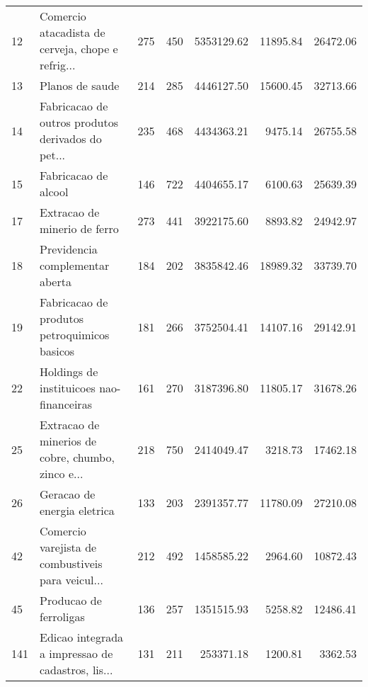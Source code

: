 \begin{tabular}{llrrrrr}
12  &  Comercio atacadista de cerveja, chope e refrig... &                   275 &                  450 &  5353129.62 &   11895.84 &                 26472.06 \\
13  &                                    Planos de saude &                   214 &                  285 &  4446127.50 &   15600.45 &                 32713.66 \\
14  &  Fabricacao de outros produtos derivados do pet... &                   235 &                  468 &  4434363.21 &    9475.14 &                 26755.58 \\
15  &                               Fabricacao de alcool &                   146 &                  722 &  4404655.17 &    6100.63 &                 25639.39 \\
17  &                       Extracao de minerio de ferro &                   273 &                  441 &  3922175.60 &    8893.82 &                 24942.97 \\
18  &                    Previdencia complementar aberta &                   184 &                  202 &  3835842.46 &   18989.32 &                 33739.70 \\
19  &       Fabricacao de produtos petroquimicos basicos &                   181 &                  266 &  3752504.41 &   14107.16 &                 29142.91 \\
22  &           Holdings de instituicoes nao-financeiras &                   161 &                  270 &  3187396.80 &   11805.17 &                 31678.26 \\
25  &  Extracao de minerios de cobre, chumbo, zinco e... &                   218 &                  750 &  2414049.47 &    3218.73 &                 17462.18 \\
26  &                        Geracao de energia eletrica &                   133 &                  203 &  2391357.77 &   11780.09 &                 27210.08 \\
42  &  Comercio varejista de combustiveis para veicul... &                   212 &                  492 &  1458585.22 &    2964.60 &                 10872.43 \\
45  &                             Producao de ferroligas &                   136 &                  257 &  1351515.93 &    5258.82 &                 12486.41 \\
141 &  Edicao integrada a impressao de cadastros, lis... &                   131 &                  211 &   253371.18 &    1200.81 &                  3362.53 \\
\bottomrule
\end{tabular}
